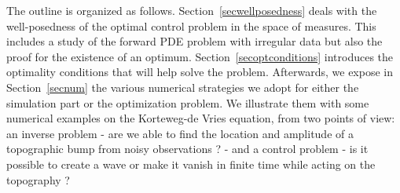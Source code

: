 The outline is organized as follows. Section~\ref{secwellposedness} deals with the well-posedness of the optimal control problem in the space of measures. This includes a study of the forward PDE problem with irregular data but also the proof for the existence of an optimum. Section~\ref{secoptconditions} introduces the optimality conditions that will help solve the problem. Afterwards, we expose in Section~\ref{secnum} the various numerical strategies we adopt for either the simulation part or the optimization problem. We illustrate them with some numerical examples on the Korteweg-de Vries equation, from two points of view: an inverse problem - are we able to find the location and amplitude of a topographic bump from noisy observations ? -  and a control problem - is it possible to create a wave or make it vanish in finite time while acting on the topography ?

